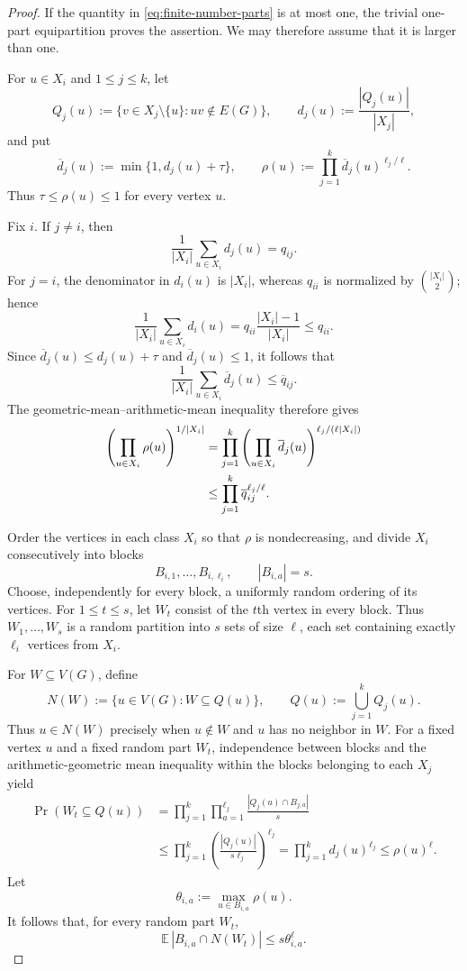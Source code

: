 \documentclass{article}
\begin{document}
\begin{proof}
If the quantity in \eqref{eq:finite-number-parts} is at most one, the trivial one-part equipartition proves the assertion.  We may therefore assume that it is larger than one.

For $u\in X_i$ and $1\le j\le k$, let
\[
 Q_j(u):=\{v\in X_j\setminus\{u\}: uv\notin E(G)\},
 \qquad
 d_j(u):=\frac{|Q_j(u)|}{|X_j|},
\]
and put
\[
 \overline d_j(u):=\min\{1,d_j(u)+\tau\},
 \qquad
 \rho(u):=\prod_{j=1}^k \overline d_j(u)^{\ell_j/\ell}.
\]
Thus $\tau\le\rho(u)\le1$ for every vertex $u$.

Fix $i$.  If $j\ne i$, then
\[
 \frac1{|X_i|}\sum_{u\in X_i}d_j(u)=q_{ij}.
\]
For $j=i$, the denominator in $d_i(u)$ is $|X_i|$, whereas $q_{ii}$ is normalized by $\binom{|X_i|}{2}$; hence
\[
 \frac1{|X_i|}\sum_{u\in X_i}d_i(u)
 =q_{ii}\frac{|X_i|-1}{|X_i|}\le q_{ii}.
\]
Since $\overline d_j(u)\le d_j(u)+\tau$ and $\overline d_j(u)\le1$, it follows that
\[
 \frac1{|X_i|}\sum_{u\in X_i}\overline d_j(u)\le \overline q_{ij}.
\]
The geometric-mean--arithmetic-mean inequality therefore gives
\begin{align}
 \left(\prod_{u\in X_i}\rho(u)\right)^{1/|X_i|}
 &=\prod_{j=1}^k
 \left(\prod_{u\in X_i}\overline d_j(u)\right)^{\ell_j/(\ell|X_i|)}
 \notag\\
 &\le \prod_{j=1}^k \overline q_{ij}^{\ell_j/\ell}.
 \label{eq:rho-geomean}
\end{align}

Order the vertices in each class $X_i$ so that $\rho$ is nondecreasing, and divide $X_i$ consecutively into blocks
\[
 B_{i,1},\dots,B_{i,\ell_i},
 \qquad |B_{i,a}|=s.
\]
Choose, independently for every block, a uniformly random ordering of its vertices.  For $1\le t\le s$, let $W_t$ consist of the $t$th vertex in every block.  Thus $W_1,\dots,W_s$ is a random partition into $s$ sets of size $\ell$, each set containing exactly $\ell_i$ vertices from $X_i$.

For $W\subseteq V(G)$, define
\[
 N(W):=\{u\in V(G): W\subseteq Q(u)\},
 \qquad Q(u):=\bigcup_{j=1}^k Q_j(u).
\]
Thus $u\in N(W)$ precisely when $u\notin W$ and $u$ has no neighbor in $W$.  For a fixed vertex $u$ and a fixed random part $W_t$, independence between blocks and the arithmetic-geometric mean inequality within the blocks belonging to each $X_j$ yield
\begin{align*}
 \Pr(W_t\subseteq Q(u))
 &=\prod_{j=1}^k\prod_{a=1}^{\ell_j}
 \frac{|Q_j(u)\cap B_{j,a}|}{s}\\
 &\le\prod_{j=1}^k
 \left(\frac{|Q_j(u)|}{s\ell_j}\right)^{\ell_j}
 =\prod_{j=1}^k d_j(u)^{\ell_j}
 \le \rho(u)^\ell.
\end{align*}
Let
\[
 \theta_{i,a}:=\max_{u\in B_{i,a}}\rho(u).
\]
It follows that, for every random part $W_t$,
\begin{equation}\label{eq:block-expectation}
 \mathbb E\,|B_{i,a}\cap N(W_t)|\le s\theta_{i,a}^{\ell}.
\end{equation}


\end{proof}
\end{document}
